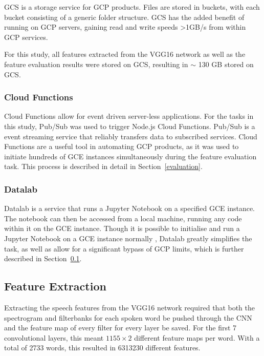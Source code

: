 GCS is a storage service for GCP products.
Files are stored in buckets, with each bucket consisting of a generic folder structure.
GCS has the added benefit of running on GCP servers, gaining read and write speeds >1GB/s from within GCP services.

For this study, all features extracted from the VGG16 network as well as the feature evaluation results were stored on GCS, resulting in $\sim$ 130 GB stored on GCS.

\subsubsection{Cloud Functions}

Cloud Functions allow for event driven server-less applications.
For the tasks in this study, Pub/Sub was used to trigger Node.js Cloud Functions.
Pub/Sub is a event streaming service that reliably transfers data to subscribed services.
Cloud Functions are a useful tool in automating GCP products, as it was used to initiate hundreds of GCE instances simultaneously during the feature evaluation task.
This process is described in detail in Section~\ref{evaluation}.

\subsubsection{Datalab}

Datalab is a service that runs a Jupyter Notebook on a specified GCE instance.
The notebook can then be accessed from a local machine, running any code within it on the GCE instance.
Though it is possible to initialise and run a Jupyter Notebook on a GCE instance normally \cite{gce}, Datalab greatly simplifies the task, as well as allow for a significant bypass of GCP limits, which is further described in Section~\ref{extraction}.

\subsection{Feature Extraction} \label{extraction}

Extracting the speech features from the VGG16 network required that both the spectrogram and filterbanks for each spoken word be pushed through the CNN and the feature map of every filter for every layer be saved.
For the first 7 convolutional layers, this meant $1155\times2$ different feature maps per word.
With a total of 2733 words, this resulted in 6313230 different features.

